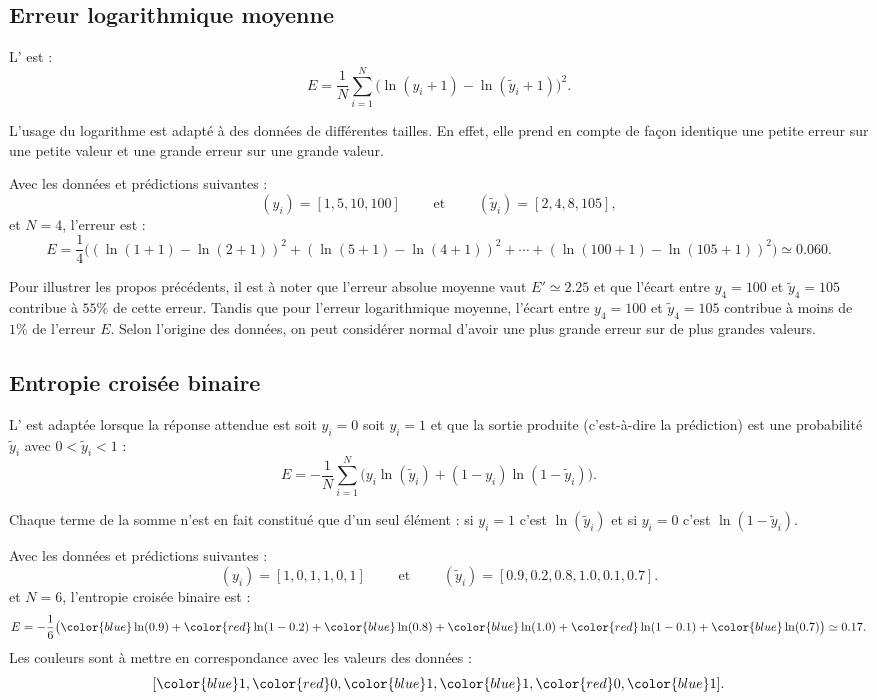 \documentclass[11pt,class=report,crop=false]{standalone}
\begin{document}
  
\subsection{Erreur logarithmique moyenne}

L' est :
$$E = \frac{1}{N} \sum_{i=1}^N \big(\ln(y_i+1) - \ln(\widetilde y_i+1)\big)^2.$$
  
L'usage du logarithme est adapté à des données de différentes tailles. En effet, elle prend en compte de façon identique une petite erreur sur une petite valeur et une grande erreur sur une grande valeur.

\begin{exemple}
Avec les données et prédictions suivantes :
$$(y_i) =  [1,5,10,100]
\qquad \text{ et } \qquad
(\widetilde y_i) = [2,4,8,105],
$$
et $N=4$, l'erreur est :
$$E = \frac{1}{4} \big( (\ln(1+1)-\ln(2+1))^2+ (\ln(5+1)-\ln(4+1))^2 + \cdots  + (\ln(100+1)-\ln(105+1))^2 \big) \simeq 0.060.$$

Pour illustrer les propos précédents, il est à noter que l'erreur absolue moyenne vaut $E' \simeq 2.25$ et que l'écart entre $y_4=100$
et $\widetilde y_4 = 105$ contribue à $55\%$ de cette erreur.
Tandis que pour l'erreur logarithmique moyenne, l'écart entre $y_4=100$
et $\widetilde y_4 = 105$ contribue à moins de $1\%$ de l'erreur $E$. Selon l'origine des données, on peut considérer normal d'avoir une plus grande erreur sur de plus grandes valeurs.
\end{exemple}   

    
\subsection{Entropie croisée binaire}

L' est adaptée lorsque la réponse attendue est soit $y_i=0$ soit $y_i=1$ et que la sortie produite (c'est-à-dire la prédiction) est une probabilité $\widetilde y_i$ avec $0 < \widetilde y_i < 1$ :
$$E = -\frac{1}{N} \sum_{i=1}^N \big( y_i \ln(\widetilde y_i) + (1-y_i) \ln(1-\widetilde y_i)\big).$$
  
Chaque terme de la somme n'est en fait constitué que d'un seul élément : si
$y_i=1$ c'est  $\ln(\widetilde y_i)$ et si $y_i=0$ c'est $\ln(1-\widetilde y_i)$.

  
\begin{exemple}
Avec les données et prédictions suivantes :
$$(y_i) =  [1,0,1,1,0,1]
\qquad \text{ et } \qquad
(\widetilde y_i) = [0.9,0.2,0.8,1.0,0.1,0.7].
$$
et $N=6$, l'entropie croisée binaire est : 
$$E = -\frac{1}{6} \big( 
{\color{blue}\ln(0.9)} + {\color{red}\ln(1-0.2)} + {\color{blue}\ln(0.8)} + 
{\color{blue}\ln(1.0)} + {\color{red}\ln(1-0.1)} + {\color{blue}\ln(0.7)}
\big) \simeq 0.17.$$
Les couleurs sont à mettre en correspondance avec les valeurs des données :
$$[{\color{blue}1},{\color{red}0},{\color{blue}1},{\color{blue}1},{\color{red}0},{\color{blue}1}].$$
\end{exemple} 
    
\end{document}
